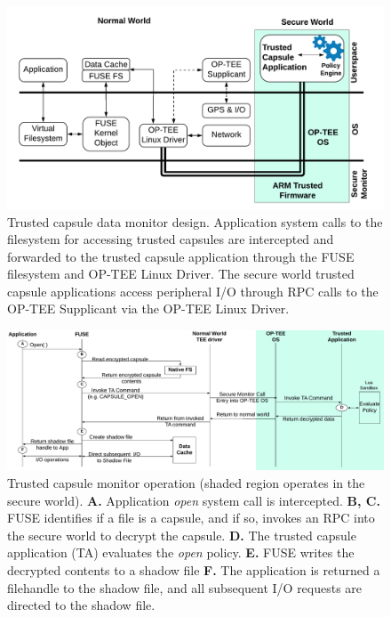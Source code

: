 \begin{figure}
    \centering
    \includegraphics[width=\columnwidth]{fig/Fig3_TC_data_monitor_system_cache.pdf}
    \caption{Trusted capsule data monitor design. Application system calls to the filesystem for accessing trusted capsules are intercepted and forwarded to the trusted capsule application through the FUSE filesystem and OP-TEE Linux Driver.
        The secure world trusted capsule applications access peripheral I/O through RPC calls to the OP-TEE Supplicant via the OP-TEE Linux Driver.}
    \label{fig:SystemModel}
\end{figure}

\begin{figure}
    \centering
    \includegraphics[width=\textwidth]{fig/TC_open_operation.pdf}
    \caption{Trusted capsule monitor operation (shaded region operates in the secure world).
        \textbf{A.} Application \textit{open} system call is intercepted.
        \textbf{B, C.} FUSE identifies if a file is a capsule, and if so, invokes an RPC into the secure world to decrypt the capsule.
        \textbf{D.} The trusted capsule application (TA) evaluates the \textit{open} policy.
        \textbf{E.} FUSE writes the decrypted contents to a shadow file
        \textbf{F.} The application is returned a filehandle to the shadow file, and all subsequent I/O requests are directed to the shadow file.
    }
    \label{fig:FlowChart}
\end{figure}

